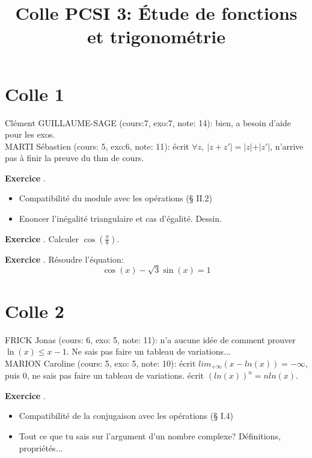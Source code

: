 \documentclass[10pt,a4paper]{article}
\title{Colle PCSI 3: Étude de fonctions et trigonométrie}
\newcounter{question}
\newcounter{exo}
\newenvironment{exo}{\vspace{0.5cm}\setcounter{question}{0}\addtocounter{exo}{1} \noindent \textbf{Exercice \theexo}. \normalsize }{\par}
\begin{document}
	\maketitle

	\section*{Colle 1}
	Clément GUILLAUME-SAGE (cours:7, exo:7, note: 14): bien, a besoin d'aide pour les exos.\\
	MARTI Sébastien (cours: 5, exo:6, note: 11): écrit $\forall z, ~\vert z + z' \vert = \vert z \vert + \vert z' \vert$, n'arrive pas à finir la preuve du thm de cours.\\
	\begin{exo} 
		\begin{itemize}
			\item Compatibilité du module avec les opérations (§ II.2)
			\item Enoncer l'inégalité triangulaire et cas d'égalité. Dessin. 
		\end{itemize}
	\end{exo}
	
	\begin{exo}
		Calculer $\cos(\frac{\pi}{8})$.
	\end{exo}
	
	\begin{exo}
		Résoudre l'équation:
		$$\cos(x) - \sqrt{3} \sin(x) = 1$$
	\end{exo}

	\section*{Colle 2}
	\setcounter{exo}{0}
	FRICK Jonas (cours: 6, exo: 5, note: 11): n'a aucune idée de comment prouver $\ln(x) \leq x - 1$. Ne sais pas faire un tableau de variations...\\
	MARION Caroline (cours: 5, exo: 5, note: 10): écrit $lim_{+\infty} (x-ln(x)) = - \infty$, puis $0$, ne sais pas faire un tableau de variations. écrit $(ln(x))^n = n ln(x)$.
	
	\begin{exo}
		\begin{itemize}
			\item Compatibilité de la conjugaison avec les opérations (§ I.4)
			\item Tout ce que tu sais sur l'argument d'un nombre complexe? Définitions, propriétés...
		\end{itemize}
	\end{exo}
\end{document}
